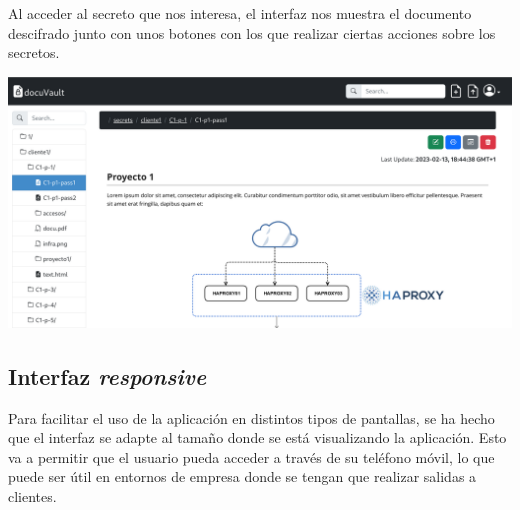 \documentclass{\ClassPath/viu-tfm-template}
\begin{document}
Al acceder al secreto que nos interesa, el interfaz nos muestra el documento descifrado junto con unos botones con los que realizar ciertas acciones sobre los secretos.

\begin{center}
    \includegraphics[frame,width=\linewidth]{img/interfaz2.png}
\end{center}



\subsection{Interfaz \textit{responsive}}

Para facilitar el uso de la aplicación en distintos tipos de pantallas, se ha hecho que el interfaz se adapte al tamaño donde se está visualizando la aplicación. Esto va a permitir que el usuario pueda acceder a través de su teléfono móvil, lo que puede ser útil en entornos de empresa donde se tengan que realizar salidas a clientes.
\end{document}
